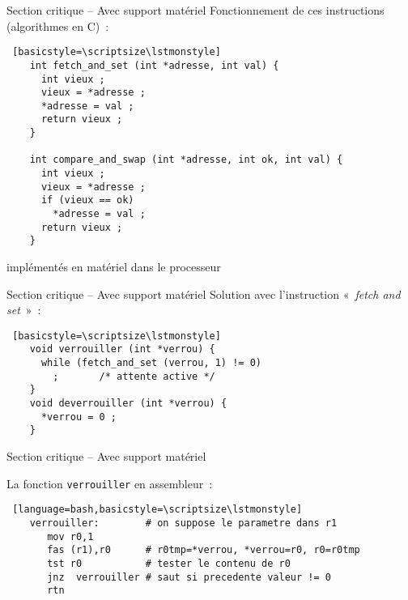 \begin {frame} [fragile] {Section critique -- Avec support matériel}
    Fonctionnement de ces instructions (algorithmes en C)~:

    \begin {lstlisting} [basicstyle=\scriptsize\lstmonstyle]
    int fetch_and_set (int *adresse, int val) {
      int vieux ;
      vieux = *adresse ;
      *adresse = val ;
      return vieux ;
    }

    int compare_and_swap (int *adresse, int ok, int val) {
      int vieux ;
      vieux = *adresse ;
      if (vieux == ok)
        *adresse = val ;
      return vieux ;
    }
    \end{lstlisting}

    \implique implémentés en matériel dans le processeur

\end{frame}


\begin {frame} [fragile] {Section critique -- Avec support matériel}
    Solution avec l'instruction «~\emph {fetch and set}~»~:

    \begin {lstlisting} [basicstyle=\scriptsize\lstmonstyle]
    void verrouiller (int *verrou) {
      while (fetch_and_set (verrou, 1) != 0)
        ;       /* attente active */
    }
    void deverrouiller (int *verrou) {
      *verrou = 0 ;
    }
    \end{lstlisting}

\end{frame}

\begin {frame} [fragile] {Section critique -- Avec support matériel}

    La fonction \texttt {verrouiller} en assembleur~:

    \begin {lstlisting} [language=bash,basicstyle=\scriptsize\lstmonstyle]
    verrouiller:        # on suppose le parametre dans r1
       mov r0,1
       fas (r1),r0      # r0tmp=*verrou, *verrou=r0, r0=r0tmp
       tst r0           # tester le contenu de r0
       jnz  verrouiller # saut si precedente valeur != 0
       rtn
    \end{lstlisting}

\end{frame}

